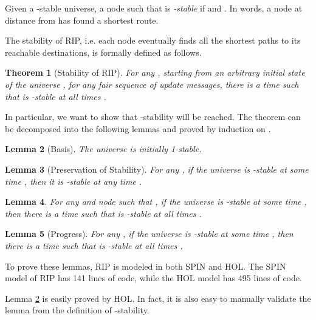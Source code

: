 \documentclass[a4paper,10pt,twocolumn]{article}
\newtheorem{theorem}{Theorem}
\newtheorem{lemma}[theorem]{Lemma}
\begin{document}
Given a -stable universe, a node  such that  is \emph{-stable} if  and . In words, a node  at distance  from  has found a shortest route.

The stability of RIP, i.e. each node eventually finds all the shortest paths to its reachable destinations, is formally defined as follows.

\begin{theorem}[Stability of RIP]\label{BOG02:Thm6}
For any , starting from an arbitrary initial state of the universe , for any fair sequence of update messages, there is a time  such that  is -stable at all times .
\end{theorem}
In particular, we want to show that -stability will be reached. The theorem can be decomposed into the following lemmas and proved by induction on .
\begin{lemma}[Basis]\label{BOG02:Lem7}
The universe  is initially 1-stable.
\end{lemma}
\begin{lemma}[Preservation of Stability]\label{BOG02:Lem8}
For any , if the universe  is -stable at some time , then it is -stable at any time .
\end{lemma}
\begin{lemma}\label{BOG02:Lem9}
For any  and node  such that , if the universe is -stable at some time , then there is a time  such that  is -stable at all times .
\end{lemma}
\begin{lemma}[Progress]\label{BOG02:Lem10}
For any , if the universe  is -stable at some time , then there is a time  such that  is -stable at all times .
\end{lemma}

To prove these lemmas, RIP is modeled in both SPIN and HOL. The SPIN model of RIP has 141 lines of code, while the HOL model has 495 lines of code.

Lemma \ref{BOG02:Lem7} is easily proved by HOL. In fact, it is also easy to manually validate the lemma from the definition of -stability.
\end{document}
